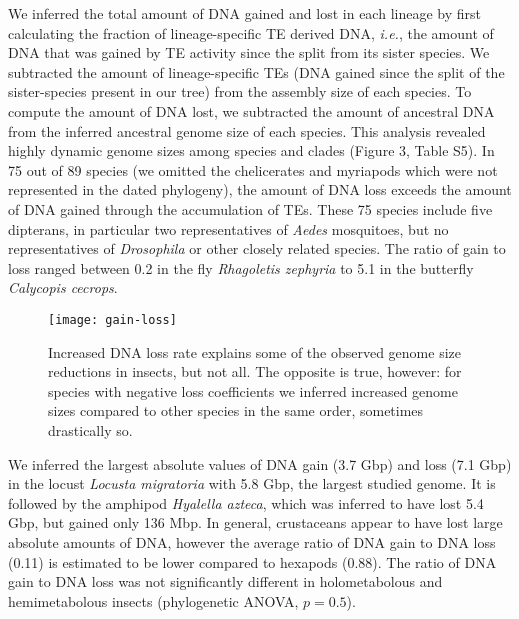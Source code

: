 We inferred the total amount of DNA gained and lost in each lineage by
first calculating the fraction of lineage-specific TE derived DNA,
\emph{i.e.}, the amount of DNA that was gained by TE activity since the
split from its sister species. We subtracted the amount of
lineage-specific TEs (DNA gained since the split of the sister-species
present in our tree) from the assembly size of each species. To compute
the amount of DNA lost, we subtracted the amount of ancestral DNA from
the inferred ancestral genome size of each species. This analysis
revealed highly dynamic genome sizes among species and clades (Figure 3,
Table S5). In 75 out of 89 species (we omitted the chelicerates and
myriapods which were not represented in the dated phylogeny), the amount
of DNA loss exceeds the amount of DNA gained through the accumulation of
TEs. These 75 species include five dipterans, in particular two
representatives of \emph{Aedes} mosquitoes, but no representatives of
\emph{Drosophila} or other closely related species. The ratio of gain to
loss ranged between 0.2 in the fly \emph{Rhagoletis zephyria} to 5.1 in
the butterfly \emph{Calycopis cecrops}.

\begin{figure}[h!]
\begin{center}
\texttt{[image: gain-loss]}
\caption{{Increased DNA loss rate explains some of the observed genome size
reductions in insects, but not all. The opposite is true, however: for
species with negative loss coefficients we inferred increased genome
sizes compared to other species in the same order, sometimes drastically
so.
{\label{700745}}%
}}
\end{center}
\end{figure}

We inferred the largest absolute values of DNA gain (3.7 Gbp) and loss
(7.1 Gbp) in the locust \emph{Locusta migratoria} with 5.8 Gbp, the
largest studied genome. It is followed by the amphipod \emph{Hyalella
azteca}, which was inferred to have lost 5.4 Gbp, but gained only 136
Mbp. In general, crustaceans appear to have lost large absolute amounts
of DNA, however the average ratio of DNA gain to DNA loss (0.11) is
estimated to be lower compared to hexapods (0.88). The ratio of DNA gain
to DNA loss was not significantly different in holometabolous and
hemimetabolous insects (phylogenetic ANOVA, \(p = 0.5\)).

